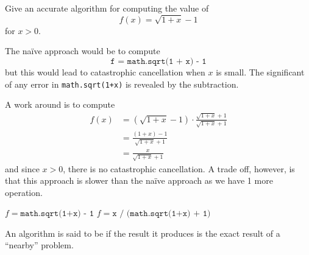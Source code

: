 \begin{example}
    Give an accurate algorithm for computing the value of \[
        f(x) = \sqrt{1 + x} - 1
    \] for \( x > 0 \).

    The na\"ive approach would be to compute \[
        \texttt{f = math.sqrt(1 + x) - 1}
    \] but this would lead to catastrophic cancellation when \( x \) is small. The significant of any error in \texttt{math.sqrt(1+x)} is revealed by the subtraction.

    A work around is to compute \begin{align*}
        f(x)
         & = (\sqrt{1+x} - 1) \cdot \frac{\sqrt{1+x}+1}{\sqrt{1+x}+1} \\
         & = \frac{(1+x) - 1}{\sqrt{1+x} + 1}                         \\
         & = \frac{x}{\sqrt{1+x} + 1}
    \end{align*} and since \( x > 0 \), there is no catastrophic cancellation. A trade off, however, is that this approach is slower than the na\"ive approach as we have 1 more operation.

    \begin{algorithm}[H]
        \begin{algorithmic}
            \State \( f = \texttt{math.sqrt(1+x) - 1} \)
            \Else
            \State \( f = \texttt{x / (math.sqrt(1+x) + 1)} \)
            \EndIf
            \EndFunction
        \end{algorithmic}
    \end{algorithm}
\end{example}

\begin{definition}
    An algorithm is said to be  if the result it produces is the exact result of a ``nearby'' problem.
\end{definition}

